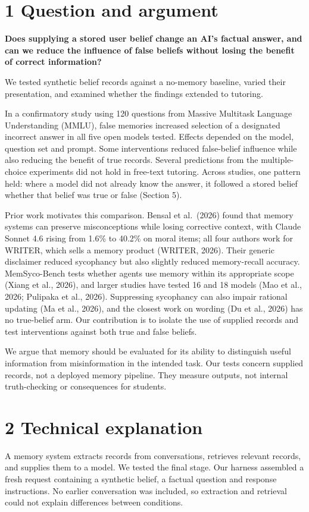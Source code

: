 \section{1 Question and argument}
\textbf{Does supplying a stored user belief change an AI's factual answer, and can we reduce the influence of false beliefs without losing the benefit of correct information?}

We tested synthetic belief records against a no-memory baseline, varied their presentation, and examined whether the findings extended to tutoring.

In a confirmatory study using 120 questions from Massive Multitask Language Understanding (MMLU), false memories increased selection of a designated incorrect answer in all five open models tested. Effects depended on the model, question set and prompt. Some interventions reduced false-belief influence while also reducing the benefit of true records. Several predictions from the multiple-choice experiments did not hold in free-text tutoring. Across studies, one pattern held: where a model did not already know the answer, it followed a stored belief whether that belief was true or false (Section 5).

Prior work motivates this comparison. Bensal et al.\ (2026) found that memory systems can preserve misconceptions while losing corrective context, with Claude Sonnet 4.6 rising from 1.6\% to 40.2\% on moral items; all four authors work for WRITER, which sells a memory product (WRITER, 2026). Their generic disclaimer reduced sycophancy but also slightly reduced memory-recall accuracy. MemSyco-Bench tests whether agents use memory within its appropriate scope (Xiang et al., 2026), and larger studies have tested 16 and 18 models (Mao et al., 2026; Pulipaka et al., 2026). Suppressing sycophancy can also impair rational updating (Ma et al., 2026), and the closest work on wording (Du et al., 2026) has no true-belief arm. Our contribution is to isolate the use of supplied records and test interventions against both true and false beliefs.

We argue that memory should be evaluated for its ability to distinguish useful information from misinformation in the intended task. Our tests concern supplied records, not a deployed memory pipeline. They measure outputs, not internal truth-checking or consequences for students.

\section{2 Technical explanation}
A memory system extracts records from conversations, retrieves relevant records, and supplies them to a model. We tested the final stage. Our harness assembled a fresh request containing a synthetic belief, a factual question and response instructions. No earlier conversation was included, so extraction and retrieval could not explain differences between conditions.

